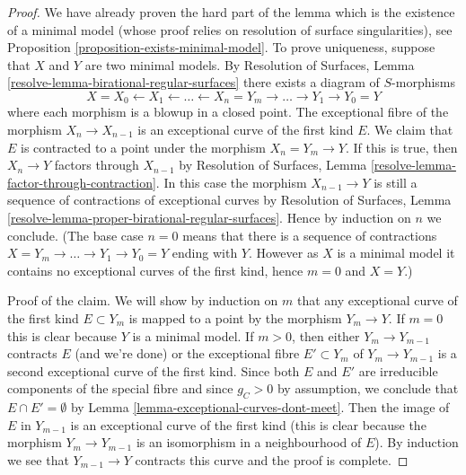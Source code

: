 \documentclass[10pt,a4paper]{amsart}
\theoremstyle{plain}
\theoremstyle{definition}
\theoremstyle{remark}
\numberwithin{equation}{subsection}
\begin{document}
\begin{proof}
We have already proven the hard part of the lemma which is the existence
of a minimal model (whose proof relies on
resolution of surface singularities), see
Proposition \ref{proposition-exists-minimal-model}.
To prove uniqueness, suppose that $X$ and $Y$ are two
minimal models. By
Resolution of Surfaces, Lemma \ref{resolve-lemma-birational-regular-surfaces}
there exists a diagram of $S$-morphisms
$$
X = X_0 \leftarrow X_1 \leftarrow \ldots \leftarrow X_n = Y_m
\to \ldots \to Y_1 \to Y_0 = Y
$$
where each morphism is a blowup in a closed point. The
exceptional fibre of the morphism $X_n \to X_{n - 1}$ is an
exceptional curve of the first kind $E$. We claim that $E$ is
contracted to a point under the morphism $X_n = Y_m \to Y$.
If this is true, then $X_n \to Y$ factors through $X_{n - 1}$ by
Resolution of Surfaces, Lemma \ref{resolve-lemma-factor-through-contraction}.
In this case the morphism $X_{n - 1} \to Y$ is still a sequence of
contractions of exceptional curves by
Resolution of Surfaces, Lemma
\ref{resolve-lemma-proper-birational-regular-surfaces}.
Hence by induction on $n$ we conclude. (The base case $n = 0$ means
that there is a sequence of contractions
$X = Y_m \to \ldots \to Y_1 \to Y_0 = Y$
ending with $Y$. However as $X$ is a minimal model it contains
no exceptional curves of the first kind, hence $m = 0$ and $X = Y$.)

\medskip\noindent
Proof of the claim. We will show by induction on $m$ that any exceptional
curve of the first kind $E \subset Y_m$ is mapped to a point
by the morphism $Y_m \to Y$. If $m = 0$ this is clear because
$Y$ is a minimal model. If $m > 0$, then either
$Y_m \to Y_{m - 1}$ contracts $E$ (and we're done) or
the exceptional fibre $E' \subset Y_m$ of $Y_m \to Y_{m - 1}$
is a second exceptional curve of the first kind.
Since both $E$ and $E'$ are irreducible components of the special
fibre and since $g_C > 0$ by assumption, we conclude that
$E \cap E' = \emptyset$ by
Lemma \ref{lemma-exceptional-curves-dont-meet}.
Then the image of $E$ in $Y_{m - 1}$ is an exceptional
curve of the first kind (this is clear because the morphism
$Y_m \to Y_{m - 1}$ is an isomorphism in a neighbourhood of $E$).
By induction we see that $Y_{m - 1} \to Y$ contracts this curve
and the proof is complete.
\end{proof}
\end{document}
